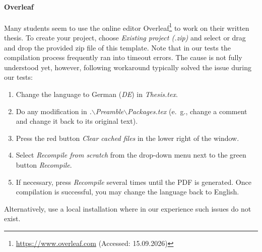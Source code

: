 \paragraph{Overleaf} Many students seem to use the online editor Overleaf\footnote{\url{https://www.overleaf.com} (Accessed: 15.09.2026)} to work on their written thesis. To create your project, choose \emph{Existing project (.zip)} and select or drag and drop the provided zip file of this template. Note that in our tests the compilation process frequently ran into timeout errors. The cause is not fully understood yet, however, following workaround typically solved the issue during our tests:
%
\begin{enumerate}
	\item Change the language to German (\emph{DE}) in \emph{Thesis.tex}.
	\item Do any modification in \emph{.$\backslash$Preamble$\backslash$Packages.tex} (e.~g., change a comment and change it back to its original text).
	\item Press the red button \emph{Clear cached files} in the lower right of the window.
	\item Select \emph{Recompile from scratch} from the drop-down menu next to the green button \emph{Recompile}.
	\item If necessary, press \emph{Recompile} several times until the PDF is generated. Once compilation is successful, you may change the language back to English.
\end{enumerate}
%
Alternatively, use a local installation where in our experience such issues do not exist.


